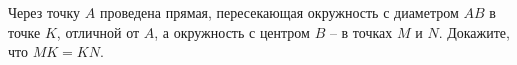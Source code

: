\begin{ex}
	\begin{condition}
		Через точку \( A  \) проведена прямая, пересекающая	окружность с диаметром \( AB  \) в точке \( K \), отличной от \( A \), а окружность с центром \( B \) – в точках \( M  \) и \( N  \). Докажите,	что \( MK = KN  \).
	\end{condition}
\end{ex}